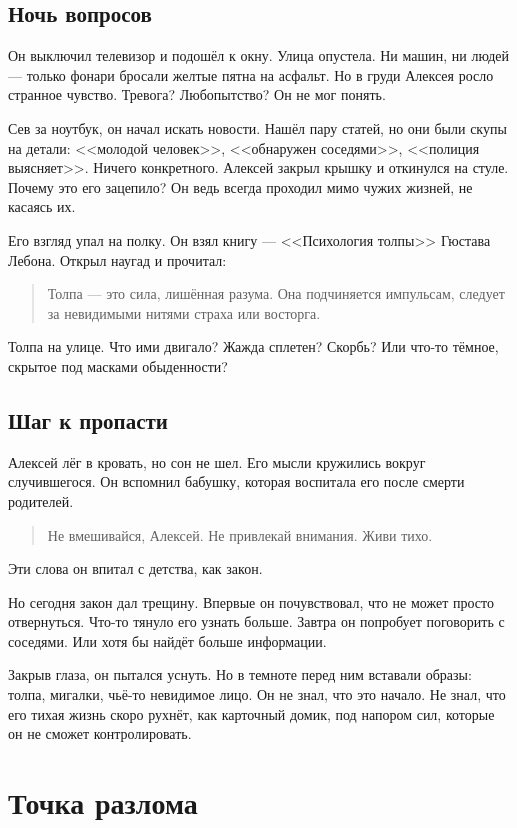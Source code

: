\documentclass[12pt,a4paper]{book}
\begin{document}
\section{Ночь вопросов}

Он выключил телевизор и подошёл к окну. Улица опустела. Ни машин, ни людей --- только фонари бросали желтые пятна на асфальт. Но в груди Алексея росло странное чувство. Тревога? Любопытство? Он не мог понять.

Сев за ноутбук, он начал искать новости. Нашёл пару статей, но они были скупы на детали: <<молодой человек>>, <<обнаружен соседями>>, <<полиция выясняет>>. Ничего конкретного. Алексей закрыл крышку и откинулся на стуле. Почему это его зацепило? Он ведь всегда проходил мимо чужих жизней, не касаясь их.

Его взгляд упал на полку. Он взял книгу --- <<Психология толпы>> Гюстава Лебона. Открыл наугад и прочитал:
\begin{quote}
Толпа --- это сила, лишённая разума. Она подчиняется импульсам, следует за невидимыми нитями страха или восторга.
\end{quote}

Толпа на улице. Что ими двигало? Жажда сплетен? Скорбь? Или что-то тёмное, скрытое под масками обыденности?

\section{Шаг к пропасти}

Алексей лёг в кровать, но сон не шел. Его мысли кружились вокруг случившегося. Он вспомнил бабушку, которая воспитала его после смерти родителей.
\begin{quote}
Не вмешивайся, Алексей. Не привлекай внимания. Живи тихо.
\end{quote}
Эти слова он впитал с детства, как закон.

Но сегодня закон дал трещину. Впервые он почувствовал, что не может просто отвернуться. Что-то тянуло его узнать больше. Завтра он попробует поговорить с соседями. Или хотя бы найдёт больше информации.

Закрыв глаза, он пытался уснуть. Но в темноте перед ним вставали образы: толпа, мигалки, чьё-то невидимое лицо. Он не знал, что это начало. Не знал, что его тихая жизнь скоро рухнёт, как карточный домик, под напором сил, которые он не сможет контролировать.

\chapter{Точка разлома}
\end{document}
